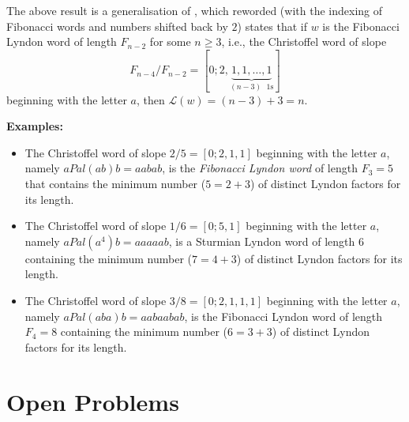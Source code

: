 \documentclass[11pt]{amsart}
\newcommand{\1}{\bar{1}}
\theoremstyle{plain}
\newtheorem{conjecture}[theorem]{Conjecture}
\theoremstyle{definition}
\theoremstyle{remark}
\begin{document}
The above result is a generalisation of \cite[Lemma 9]{kS14lynd}, which reworded (with the indexing of Fibonacci words and numbers shifted back by $2$) states that if $w$ is the Fibonacci Lyndon word of length $F_{n-2}$ for some $n\geq 3$, i.e., the Christoffel word of slope 
\[
F_{n-4}/F_{n-2} = [0;2,\underbrace{1,1, \ldots, 1}_{\mbox{$(n-3)$ $1$s}}]
\]
beginning with the letter $a$, then $\mathcal{L}(w) = (n-3)+3 = n$.


\textbf{Examples:}

\begin{itemize}
\item The Christoffel word of slope $2/5=[0;2,1,1]$ beginning with the letter $a$, namely $aPal(ab)b = aabab$, is the \textit{Fibonacci Lyndon word} of length $F_3=5$ that contains the minimum number ($5 = 2 + 3$) of distinct Lyndon factors for its length.

\item The Christoffel word of slope $1/6=[0;5,1]$ beginning with the letter $a$, namely  $aPal(a^4)b = aaaaab$, is a Sturmian Lyndon word of length $6$ containing the minimum number ($7=4+3$) of distinct Lyndon factors for its length.

\item The Christoffel word of slope $3/8=[0;2,1,1,1]$ beginning with the letter $a$, namely $aPal(aba)b = aabaabab$, is the Fibonacci Lyndon word of length $F_4 = 8$ containing the minimum number ($6 = 3 + 3$) of distinct Lyndon factors for its length.

\end{itemize}





\section{Open Problems}
\label{sect-6}
\end{document}

